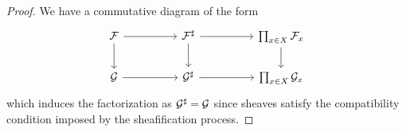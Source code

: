 \begin{proof}
    We have a commutative diagram of the form 
    $$%
    \begin{tikzcd}
        \Fcal && {\Fcal^{\sharp}} && {\prod_{x\in X}\Fcal_{x}} \\
        \Gcal && {\Gcal^{\sharp}} && {\prod_{x\in X}\Gcal_{x}}
        \arrow[from=1-1, to=1-3]
        \arrow[from=1-1, to=2-1]
        \arrow[from=1-3, to=1-5]
        \arrow[from=1-3, to=2-3]
        \arrow[from=1-5, to=2-5]
        \arrow[from=2-1, to=2-3]
        \arrow[from=2-3, to=2-5]
    \end{tikzcd}$$
    which induces the factorization as $\mathcal{G}^{\sharp}=\mathcal{G}$ since sheaves satisfy the compatibility condition imposed by the sheafification process.
\end{proof}

